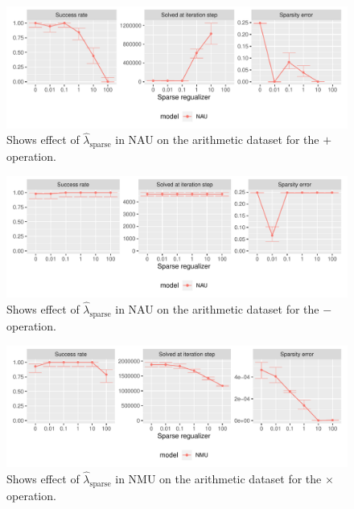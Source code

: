 \begin{figure}[H]
\centering
\includegraphics[width=\linewidth,trim={0 1.3cm 0 0},clip]{results/simple_function_static_regualization_add.pdf}
\caption{Shows effect of $\hat{\lambda}_{\mathrm{sparse}}$ in NAU on the arithmetic dataset for the $\bm{+}$ operation.}
\label{fig:simple-fnction-static-regularizer-add}
\end{figure}

\begin{figure}[H]
\centering
\includegraphics[width=\linewidth,trim={0 1.3cm 0 0},clip]{results/simple_function_static_regualization_sub.pdf}
\caption{Shows effect of $\hat{\lambda}_{\mathrm{sparse}}$ in NAU on the arithmetic dataset for the $\bm{-}$ operation.}
\label{fig:simple-fnction-static-regularizer-sub}
\end{figure}

\begin{figure}[H]
\centering
\includegraphics[width=\linewidth,trim={0 1.3cm 0 0},clip]{results/simple_function_static_regualization_mul.pdf}
\caption{Shows effect of $\hat{\lambda}_{\mathrm{sparse}}$ in NMU on the arithmetic dataset for the $\bm{\times}$ operation.}
\label{fig:simple-fnction-static-regularizer-mul}
\end{figure}

